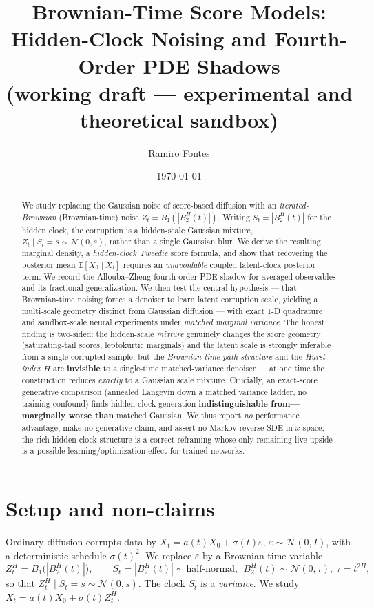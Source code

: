 \documentclass[11pt]{article}
\title{Brownian-Time Score Models:\\
       Hidden-Clock Noising and Fourth-Order PDE Shadows\\
       \large (working draft --- experimental and theoretical sandbox)}
\author{Ramiro Fontes}
\date{\today}
\theoremstyle{definition}
\newcommand{\E}{\mathbb{E}}
\begin{document}
\maketitle

\begin{abstract}
We study replacing the Gaussian noise of score-based diffusion with an
\emph{iterated-Brownian} (Brownian-time) noise $Z_t=B_1(|B_2^H(t)|)$. Writing
$S_t=|B_2^H(t)|$ for the hidden clock, the corruption is a hidden-scale Gaussian
mixture, $Z_t\mid S_t=s\sim\mathcal N(0,s)$, rather than a single Gaussian blur.
We derive the resulting marginal density, a \emph{hidden-clock Tweedie} score
formula, and show that recovering the posterior mean $\E[X_0\mid X_t]$ requires
an \emph{unavoidable} coupled latent-clock posterior term. We record the
Allouba--Zheng fourth-order PDE shadow for averaged observables and its
fractional generalization. We then test the central hypothesis --- that
Brownian-time noising forces a denoiser to learn latent corruption scale,
yielding a multi-scale geometry distinct from Gaussian diffusion --- with exact
1-D quadrature and sandbox-scale neural experiments under \emph{matched marginal
variance}. The honest finding is two-sided: the hidden-scale \emph{mixture}
genuinely changes the score geometry (saturating-tail scores, leptokurtic
marginals) and the latent scale is strongly inferable from a single corrupted
sample; but the \emph{Brownian-time path structure} and the \emph{Hurst index}
$H$ are \textbf{invisible} to a single-time matched-variance denoiser --- at one
time the construction reduces \emph{exactly} to a Gaussian scale mixture.
Crucially, an exact-score generative comparison (annealed Langevin down a matched
variance ladder, no training confound) finds hidden-clock generation
\textbf{indistinguishable from---marginally worse than} matched Gaussian. We thus
report \emph{no} performance advantage, make no generative claim, and assert no
Markov reverse SDE in $x$-space; the rich hidden-clock structure is a correct
reframing whose only remaining live upside is a possible learning/optimization
effect for trained networks.
\end{abstract}

\section{Setup and non-claims}
Ordinary diffusion corrupts data by $X_t=a(t)X_0+\sigma(t)\varepsilon$,
$\varepsilon\sim\mathcal N(0,I)$, with a deterministic schedule $\sigma(t)^2$. We
replace $\varepsilon$ by a Brownian-time variable
\begin{equation}
  Z_t^H=B_1\!\big(|B_2^H(t)|\big),\qquad
  S_t=|B_2^H(t)|\sim\text{half-normal},\ \ B_2^H(t)\sim\mathcal N(0,\tau),\
  \tau=t^{2H},
\end{equation}
so that $Z_t^H\mid S_t=s\sim\mathcal N(0,s)$. The clock $S_t$ is a
\emph{variance}. We study $X_t=a(t)X_0+\sigma(t)Z_t^H$.
\end{document}
